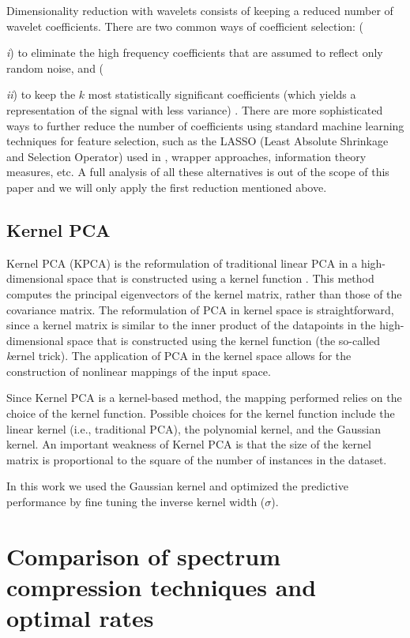 \documentclass[a4paper,fleqn,usenatbib]{mnras}
\begin{document}
{Dimensionality reduction with wavelets consists of keeping a reduced
number of wavelet coefficients. There are two common ways of
coefficient selection: ({\textit i) to eliminate the high frequency
  coefficients that are assumed to reflect only random noise, and
  ({\textit {ii}) to keep the $k$ most statistically significant
    coefficients (which yields a representation of the signal with
    less variance) \citep{li:10}. There are more sophisticated ways to
    further reduce the number of coefficients using standard machine
    learning techniques for feature selection, such as the LASSO
    (Least Absolute Shrinkage and Selection Operator) used in
    \cite{2015MNRAS.452.1394L}, wrapper approaches, information theory
    measures, etc. A full analysis of all these alternatives is out of
    the scope of this paper and we will only apply the first reduction
    mentioned above.

\subsection{Kernel PCA}

Kernel PCA (KPCA) is the reformulation of traditional linear PCA in a
high-dimensional space that is constructed using a kernel function
\citep{sholkopf:98}. This method computes the principal eigenvectors
of the kernel matrix, rather than those of the covariance matrix. The
reformulation of PCA in kernel space is straightforward, since a
kernel matrix is similar to the inner product of the datapoints in the
high-dimensional space that is constructed using the kernel function
(the so-called {\textit kernel trick}). The application of PCA in the
kernel space allows for the construction of nonlinear mappings of the
input space.

Since Kernel PCA is a kernel-based method, the mapping performed
relies on the choice of the kernel function. Possible choices for the
kernel function include the linear kernel (i.e., traditional PCA), the
polynomial kernel, and the Gaussian kernel. An important weakness of
Kernel PCA is that the size of the kernel matrix is proportional to
the square of the number of instances in the dataset.

In this work we used the Gaussian kernel and optimized the predictive
performance by fine tuning the inverse kernel width ($\sigma$). 

\section{Comparison of spectrum compression techniques and optimal rates}
\label{sec:comparison1}

}}}
\end{document}
